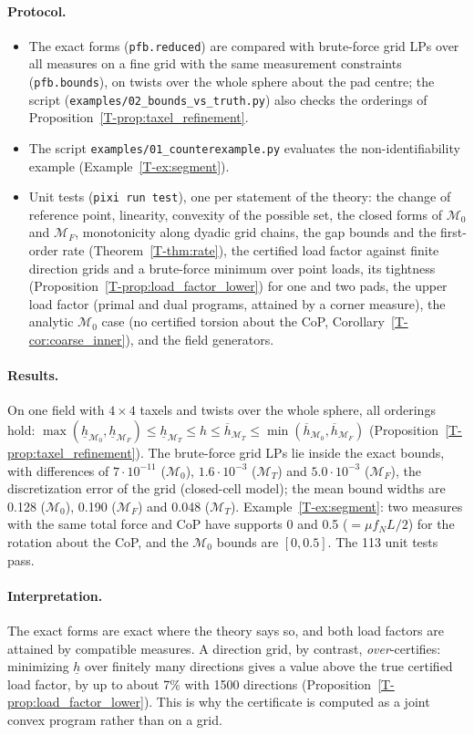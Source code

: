 \documentclass[11pt,a4paper]{article}
\newcommand{\M}{\mathcal M}
\newcommand{\T}[1]{\ref{T-#1}}                       %
\newcommand{\code}[1]{\texttt{#1}}
\begin{document}
\paragraph{Protocol.}
\begin{itemize}
    \item The exact forms (\code{pfb.reduced}) are compared with brute-force grid LPs over all measures on a fine grid with the same
    measurement constraints (\code{pfb.bounds}), on twists over the whole sphere about the pad centre; the script
    (\code{examples/02\_bounds\_vs\_truth.py}) also checks the orderings of Proposition~\T{prop:taxel_refinement}.
    \item The script \code{examples/01\_counterexample.py} evaluates the non-identifiability example (Example~\T{ex:segment}).
    \item Unit tests (\code{pixi run test}), one per statement of the theory: the change of reference point, linearity, convexity of the possible set,
    the closed forms of $\M_0$ and $\M_F$, monotonicity along dyadic grid chains, the gap bounds and the first-order rate (Theorem~\T{thm:rate}), the
    certified load factor against finite direction grids and a brute-force minimum over point loads, its tightness (Proposition~\T{prop:load_factor_lower})
    for one and two pads, the upper load factor (primal and dual programs, attained by a corner measure), the analytic $\M_0$ case (no certified torsion about the CoP, Corollary~\T{cor:coarse_inner}), and the field generators.
\end{itemize}
\paragraph{Results.} On one field with $4\times4$ taxels and twists over the whole sphere, all orderings hold:
$\max(\underline h_{\M_0},\underline h_{\M_F})\le\underline h_{\M_T}\le h\le\overline h_{\M_T}\le\min(\overline h_{\M_0},\overline h_{\M_F})$
(Proposition~\T{prop:taxel_refinement}). The brute-force grid LPs lie inside the exact bounds, with differences of
$7\cdot10^{-11}$ ($\M_0$), $1.6\cdot10^{-3}$ ($\M_T$) and $5.0\cdot10^{-3}$ ($\M_F$), the discretization error of the grid (closed-cell model); the mean bound widths are 0.128 ($\M_0$), 0.190 ($\M_F$) and 0.048 ($\M_T$). Example~\T{ex:segment}: two measures with the
same total force and CoP have supports 0 and 0.5 ($=\mu f_NL/2$) for the rotation about the CoP, and the $\M_0$ bounds are $[0,0.5]$. The 113 unit
tests pass.
\paragraph{Interpretation.} The exact forms are exact where the theory says so, and both load factors are attained by compatible measures.
A direction grid, by contrast, \emph{over}-certifies: minimizing $\underline h$ over finitely many directions gives a value above the true
certified load factor, by up to about 7\% with 1500 directions (Proposition~\T{prop:load_factor_lower}). This is why the certificate is
computed as a joint convex program rather than on a grid.
\end{document}
